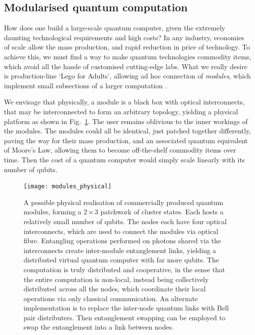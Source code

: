 %
%

\subsection{Modularised quantum computation} \label{sec:module} 

How does one build a large-scale quantum computer, given the extremely daunting technological requirements and high costs? In any industry, economies of scale allow the mass production, and rapid reduction in price of technology. To achieve this, we must find a way to make quantum technologies commodity items, which avoid all the hassle of customised cutting-edge labs. What we really desire is production-line `Lego for Adults{\texttrademark}', allowing ad hoc connection of \textit{modules}, which implement small subsections of a larger computation \cite{bib:FowlerPrivate}.

We envisage that physically, a module is a black box with optical interconnects, that may be interconnected to form an arbitrary topology, yielding a physical platform as shown in Fig.~\ref{fig:modules_physical}. The user remains oblivious to the inner workings of the modules. The modules could all be identical, just patched together differently, paving the way for their mass production, and an associated quantum equivalent of Moore's Law, allowing them to become off-the-shelf commodity items over time. Then the cost of a quantum computer would simply scale linearly with its number of qubits.

\begin{figure}[!htbp]
	\texttt{[image: modules\_physical]}
	\captionspacefig \caption{A possible physical realisation of commercially produced quantum modules, forming a \mbox{$2\times 3$} patchwork of cluster states. Each hosts a relatively small number of qubits. The nodes each have four optical interconnects, which are used to connect the modules via optical fibre. Entangling operations performed on photons shared via the interconnects create inter-module entanglement links, yielding a distributed virtual quantum computer with far more qubits. The computation is truly distributed and cooperative, in the sense that the entire computation is non-local, instead being collectively distributed across all the nodes, which coordinate their local operations via only classical communication. An alternate implementation is to replace the inter-node quantum links with Bell pair distributers. Then entanglement swapping can be employed to swap the entanglement into a link between nodes.}\label{fig:modules_physical}
\end{figure}

